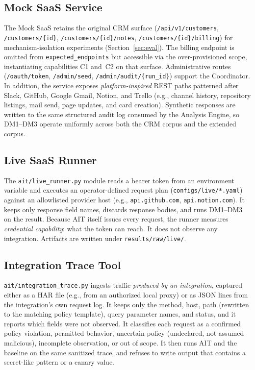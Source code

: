 \documentclass[conference]{IEEEtran}
\begin{document}
\subsection{Mock SaaS Service}

The Mock SaaS retains the original CRM surface
(\texttt{/api/v1/customers}, \texttt{/customers/\{id\}},
\texttt{/customers/\{id\}/notes}, \texttt{/customers/\{id\}/billing})
for mechanism-isolation experiments (Section~\ref{sec:eval}).
The billing endpoint is omitted from \texttt{expected\_endpoints} but
accessible via the over-provisioned scope, instantiating capabilities
C1 and~C2 on that surface.
Administrative routes (\texttt{/oauth/token}, \texttt{/admin/seed},
\texttt{/admin/audit/\{run\_id\}}) support the Coordinator. In
addition, the service exposes \emph{platform-inspired} REST paths
patterned after Slack, GitHub, Google Gmail, Notion, and Trello (e.g.,
channel history, repository listings, mail send, page updates, and
card creation). Synthetic responses are written to the same structured
audit log consumed by the Analysis Engine, so DM1--DM3 operate
uniformly across both the CRM corpus and the extended corpus.

\subsection{Live SaaS Runner}

The \texttt{ait/live\_runner.py} module reads a bearer token from an
environment variable and executes an operator-defined request plan
(\texttt{configs/live/*.yaml}) against an allowlisted provider host
(e.g., \texttt{api.github.com}, \texttt{api.notion.com}). It keeps only
response field names, discards response bodies, and runs DM1--DM3 on the
result. Because AIT itself issues every request, the runner measures
\emph{credential capability}: what the token can reach. It does not
observe any integration. Artifacts are written under
\texttt{results/raw/live/}.

\subsection{Integration Trace Tool}

\texttt{ait/integration\_trace.py} ingests traffic \emph{produced by an
integration}, captured either as a HAR file (e.g., from an authorized
local proxy) or as JSON lines from the integration's own request log. It
keeps only the method, host, path (rewritten to the matching policy
template), query parameter names, and status, and it reports which
fields were not observed. It classifies each request as a confirmed
policy violation, permitted behavior, uncertain policy (undeclared, not
assumed malicious), incomplete observation, or out of scope. It then
runs AIT and the baseline on the same sanitized trace, and refuses to
write output that contains a secret-like pattern or a canary value.
\end{document}
